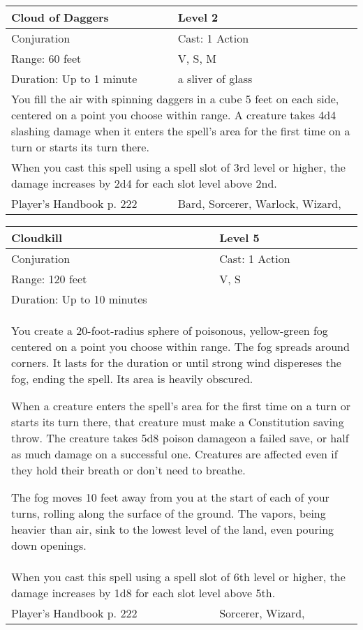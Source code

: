 \documentclass[11pt]{report}
\begin{document}
\begin{table}[H]
	\begin{tabular}{||p{6cm}|p{6cm}||}
		\hline\hline
		\bf{Cloud of Daggers} & Level 2\\ \hline
		Conjuration & Cast: 1 Action\\ \hline
		Range: 60 feet & V, S, M \\ \hline
		Duration: Up to 1 minute & a sliver of glass\\ \hline
		\multicolumn{2}{||p{12cm}||}{You fill the air with spinning daggers in a cube 5 feet on each side, centered on a point you choose within range. A creature takes 4d4 slashing damage when it enters the spell’s area for the first time on a turn or starts its turn there.}\\ \hline
		\multicolumn{2}{||p{12cm}||}{When you cast this spell using a spell slot of 3rd level or higher, the damage increases by 2d4 for each slot level above 2nd.}\\ \hline
Player's Handbook p. 222 & Bard, Sorcerer, Warlock, Wizard, \\ \hline\hline
	\end{tabular}
\end{table}

\begin{table}[H]
	\begin{tabular}{||p{6cm}|p{6cm}||}
		\hline\hline
		\bf{Cloudkill} & Level 5\\ \hline
		Conjuration & Cast: 1 Action\\ \hline
		Range: 120 feet & V, S\\ \hline
		Duration: Up to 10 minutes & \\ \hline
		\multicolumn{2}{||p{12cm}||}{You create a 20-foot-radius sphere of poisonous, yellow-green fog centered on a point you choose within range. The fog spreads around corners. It lasts for the duration or until strong wind dispereses the fog, ending the spell. Its area is heavily obscured. 

When a creature enters the spell’s area for the first time on a turn or starts its turn there, that creature must make a Constitution saving throw. The creature takes 5d8 poison damageon a failed save, or half as much damage on a successful one. Creatures are affected even if they hold their breath or don’t need to breathe. 

The fog moves 10 feet away from you at the start of each of your turns, rolling along the surface of the ground. The vapors, being heavier than air, sink to the lowest level of the land, even pouring down openings.}\\ \hline
		\multicolumn{2}{||p{12cm}||}{When you cast this spell using a spell slot of 6th level or higher, the damage increases by 1d8 for each slot level above 5th.}\\ \hline
Player's Handbook p. 222 & Sorcerer, Wizard, \\ \hline\hline
	\end{tabular}
\end{table}
\end{document}

